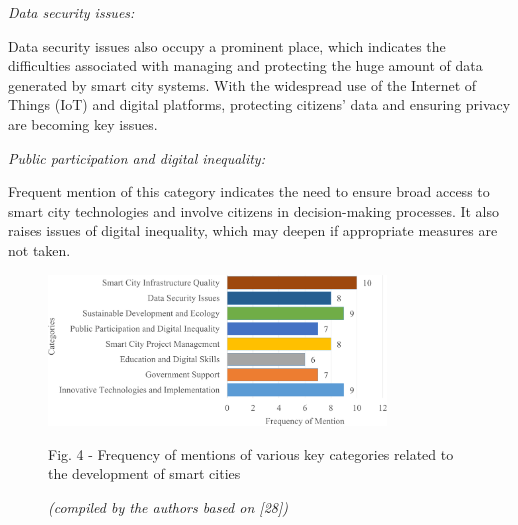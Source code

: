 \begin{multicols}{2}
\emph{Data security issues:}

Data security issues also occupy a prominent place, which indicates the
difficulties associated with managing and protecting the huge amount of
data generated by smart city systems. With the widespread use of the
Internet of Things (IoT) and digital platforms, protecting
citizens'{} data and ensuring privacy are becoming key
issues.

\emph{Public participation and digital inequality:}

Frequent mention of this category indicates the need to ensure broad
access to smart city technologies and involve citizens in
decision-making processes. It also raises issues of digital inequality,
which may deepen if appropriate measures are not taken.
\end{multicols}

\begin{figure}[H]
	\centering
	\includegraphics[width=0.8\textwidth]{media/ekon/Graph_15}
	\caption*{Fig. 4 - Frequency of mentions of various key categories related to the development of smart cities}
	\caption*{\normalfont \emph{(compiled by the authors based on {[}28{]})}}
\end{figure}

